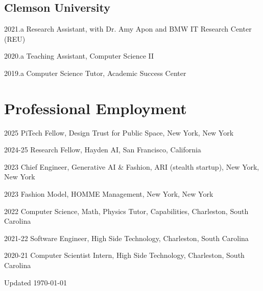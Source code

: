 \documentclass[10pt,letterpaper]{report}
\begin{document}
    \subsection*{Clemson University} 
    \begin{tablist}
        \item[2021.a] Research Assistant, with Dr. Amy Apon and BMW IT Research Center (REU)
        \item[2020.a] Teaching Assistant, Computer Science II
        \item[2019.a] Computer Science Tutor, Academic Success Center 

    \end{tablist}

    
    \section*{Professional Employment}

    \begin{tablist}
        \item[2025] \tab{}PiTech Fellow, Design Trust for Public Space, New York, New York
        \item[2024-25] \tab{}Research Fellow, Hayden AI, San Francisco, California 
        \item[2023] \tab{}Chief Engineer, Generative AI \& Fashion, ARI (stealth startup), New York, New York
        \item[2023] \tab{}Fashion Model, HOMME Management, New York, New York
        \item[2022] \tab{}Computer Science, Math, Physics Tutor, Capabilities, Charleston, South Carolina 
        \item[2021-22] \tab{}Software Engineer, High Side Technology, Charleston, South Carolina 
        \item[2020-21] \tab{}Computer Scientist Intern, High Side Technology, Charleston, South Carolina 

    \end{tablist}



    \begin{center}
        \vfill
        Updated \monthyeardate\today
    \end{center}
\end{document}
